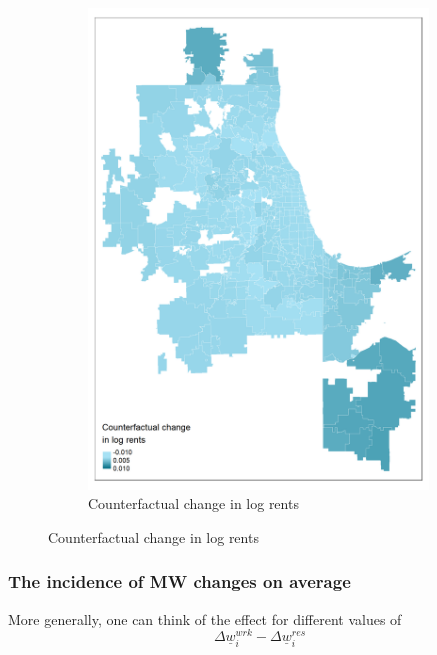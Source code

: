 \documentclass[aspectratio=169, t]{beamer}
\newcommand{\MW}{\underline{w}}
\begin{document}
\begin{frame}
\begin{figure}
\begin{subfigure}{0.33\textwidth}
                         \includegraphics[width = 0.99\textwidth]{counterfactuals/output/chicago_d_ln_rents.png}
			\caption*{Counterfactual change in log rents}
		\end{subfigure}
	\end{figure}	
\end{frame}

\begin{frame}
	\frametitle{The incidence of MW changes on average}
	
	\vspace{3mm}
    

	\pause
	\vspace{3mm}

	More generally, one can think of the effect for different values of 
	$$
		\Delta \MW_i^{wrk} - \Delta \MW_i^{res}
	$$
\end{frame}
\end{document}
